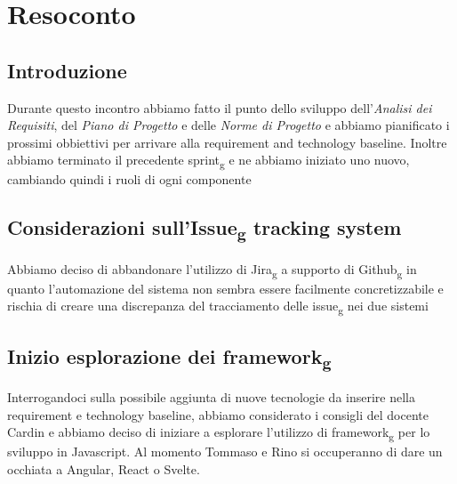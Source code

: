 \section{Resoconto}
\subsection{Introduzione}
Durante questo incontro abbiamo fatto il punto dello sviluppo dell'\textit{Analisi dei Requisiti}, del \textit{Piano di Progetto} e delle \textit{Norme di Progetto} e abbiamo pianificato i prossimi obbiettivi per arrivare alla requirement and technology baseline. Inoltre abbiamo terminato il precedente sprint\textsubscript{g} e ne abbiamo iniziato uno nuovo, cambiando quindi i ruoli di ogni componente

\subsection{Considerazioni sull'Issue\textsubscript{g} tracking system}
Abbiamo deciso di abbandonare l'utilizzo di Jira\textsubscript{g} a supporto di Github\textsubscript{g} in quanto l'automazione del sistema non sembra essere facilmente concretizzabile e rischia di creare una discrepanza del tracciamento delle issue\textsubscript{g} nei due sistemi

\subsection{Inizio esplorazione dei framework\textsubscript{g}}
Interrogandoci sulla possibile aggiunta di nuove tecnologie da inserire nella requirement e technology baseline, abbiamo considerato i consigli del docente Cardin e abbiamo deciso di iniziare a esplorare l'utilizzo di framework\textsubscript{g} per lo sviluppo in Javascript. Al momento Tommaso e Rino si occuperanno di dare un occhiata a Angular, React o Svelte.


